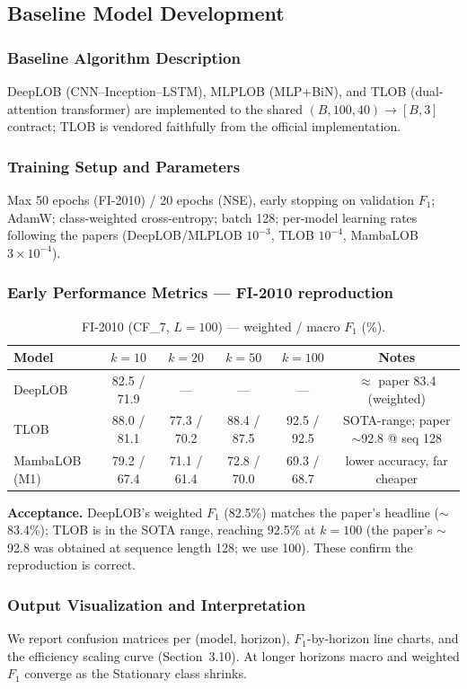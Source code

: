 \documentclass[11pt]{article}
\begin{document}
\subsection{Baseline Model Development}
\subsubsection{Baseline Algorithm Description}
DeepLOB (CNN--Inception--LSTM), MLPLOB (MLP+BiN), and TLOB (dual-attention transformer) are implemented to
the shared $(B,100,40)\rightarrow[B,3]$ contract; TLOB is vendored faithfully from the official
implementation.

\subsubsection{Training Setup and Parameters}
Max 50 epochs (FI-2010) / 20 epochs (NSE), early stopping on validation $F_1$; AdamW; class-weighted
cross-entropy; batch 128; per-model learning rates following the papers (DeepLOB/MLPLOB $10^{-3}$, TLOB
$10^{-4}$, MambaLOB $3\times10^{-4}$).

\subsubsection{Early Performance Metrics --- FI-2010 reproduction}
\begin{table}[h]
\centering
\caption{FI-2010 (CF\_7, $L=100$) --- weighted / macro $F_1$ (\%).}
\label{tab:fi2010}
\begin{tabular}{@{}lccccc@{}}
\toprule
Model & $k{=}10$ & $k{=}20$ & $k{=}50$ & $k{=}100$ & Notes \\
\midrule
DeepLOB & 82.5 / 71.9 & --- & --- & --- & $\approx$ paper 83.4 (weighted) \\
TLOB    & 88.0 / 81.1 & 77.3 / 70.2 & 88.4 / 87.5 & 92.5 / 92.5 & SOTA-range; paper $\sim$92.8 @ seq 128 \\
MambaLOB (M1) & 79.2 / 67.4 & 71.1 / 61.4 & 72.8 / 70.0 & 69.3 / 68.7 & lower accuracy, far cheaper \\
\bottomrule
\end{tabular}
\end{table}
\textbf{Acceptance.} DeepLOB's weighted $F_1$ (82.5\%) matches the paper's headline ($\sim$83.4\%); TLOB is
in the SOTA range, reaching 92.5\% at $k{=}100$ (the paper's $\sim$92.8 was obtained at sequence length
128; we use 100). These confirm the reproduction is correct.

\subsubsection{Output Visualization and Interpretation}
We report confusion matrices per (model, horizon), $F_1$-by-horizon line charts, and the efficiency
scaling curve (Section~3.10). At longer horizons macro and weighted $F_1$ converge as the Stationary class
shrinks.
\end{document}
